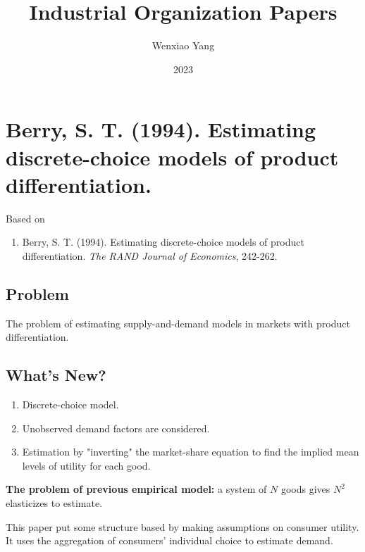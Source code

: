 \documentclass[11pt]{elegantbook}
\title{\textbf{Industrial Organization Papers}}
\author{Wenxiao Yang}
\institute{Haas School of Business, University of California Berkeley}
\date{2023}
\begin{document}
\maketitle
\frontmatter
\tableofcontents
\mainmatter


\chapter{Berry, S. T. (1994). Estimating discrete-choice models of product differentiation.}
Based on
\begin{enumerate}[$\circ$]
    \item Berry, S. T. (1994). Estimating discrete-choice models of product differentiation. \textit{The RAND Journal of Economics}, 242-262.
\end{enumerate}


\section{Problem}
The problem of estimating supply-and-demand models in markets with product differentiation.


\section{What's New?}
\begin{enumerate}
    \item Discrete-choice model.
    \item Unobserved demand factors are considered.
    \item Estimation by "inverting" the market-share equation to find the implied mean levels of utility for each good.
\end{enumerate}
\begin{note}
    \textbf{The problem of previous empirical model:} a system of $N$ goods gives $N^2$ elasticizes to estimate.
\end{note}
This paper put some structure based by making assumptions on consumer utility. It uses the aggregation of consumers' individual choice to estimate demand.
\end{document}
